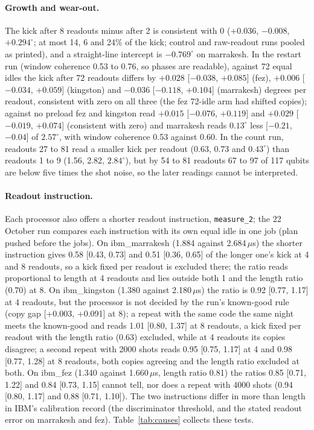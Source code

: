 \documentclass[reprint,amsmath,amssymb,aps,superscriptaddress,nofootinbib]{revtex4-2}
\newcommand{\us}{\,$\mu$s}
\begin{document}
\paragraph*{Growth and wear-out.} The kick after 8 readouts minus after 2 is consistent with 0 ($+0.036$, $-0.008$, $+0.294^\circ$; at most 14, 6 and 24\% of the kick; control and raw-readout runs pooled as printed), and a straight-line intercept is $-0.769^\circ$ on marrakesh. In the restart run (window coherence 0.53 to 0.76, so phases are readable), against 72 equal idles the kick after 72 readouts differs by $+0.028$ [$-0.038$, $+0.085$] (fez), $+0.006$ [$-0.034$, $+0.059$] (kingston) and $-0.036$ [$-0.118$, $+0.104$] (marrakesh) degrees per readout, consistent with zero on all three (the fez 72-idle arm had shifted copies); against no preload fez and kingston read $+0.015$ [$-0.076$, $+0.119$] and $+0.029$ [$-0.019$, $+0.074$] (consistent with zero) and marrakesh reads $0.13^\circ$ less [$-0.21$, $-0.04$] of $2.57^\circ$, with window coherence 0.53 against 0.60. In the count run, readouts 27 to 81 read a smaller kick per readout (0.63, 0.73 and $0.43^\circ$) than readouts 1 to 9 (1.56, 2.82, $2.84^\circ$), but by 54 to 81 readouts 67 to 97 of 117 qubits are below five times the shot noise, so the later readings cannot be interpreted.

\paragraph*{Readout instruction.} Each processor also offers a shorter readout instruction, \texttt{measure\_2}; the 22 October run compares each instruction with its own equal idle in one job (plan pushed before the jobs). On ibm\_marrakesh (1.884 against 2.684\us) the shorter instruction gives 0.58 [0.43, 0.73] and 0.51 [0.36, 0.65] of the longer one's kick at 4 and 8 readouts, so a kick fixed per readout is excluded there; the ratio reads proportional to length at 4 readouts and lies outside both 1 and the length ratio (0.70) at 8. On ibm\_kingston (1.380 against 2.180\us) the ratio is 0.92 [0.77, 1.17] at 4 readouts, but the processor is not decided by the run's known-good rule (copy gap [+0.003, +0.091] at 8); a repeat with the same code the same night meets the known-good and reads 1.01 [0.80, 1.37] at 8 readouts, a kick fixed per readout with the length ratio (0.63) excluded, while at 4 readouts its copies disagree; a second repeat with 2000 shots reads 0.95 [0.75, 1.17] at 4 and 0.98 [0.77, 1.28] at 8 readouts, both copies agreeing and the length ratio excluded at both. On ibm\_fez (1.340 against 1.660\us, length ratio 0.81) the ratios 0.85 [0.71, 1.22] and 0.84 [0.73, 1.15] cannot tell, nor does a repeat with 4000 shots (0.94 [0.80, 1.17] and 0.88 [0.71, 1.10]). The two instructions differ in more than length in IBM's calibration record (the discriminator threshold, and the stated readout error on marrakesh and fez). Table~\ref{tab:causes} collects these tests.
\end{document}
